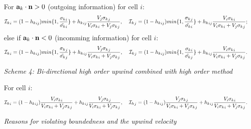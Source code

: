\noindent
For ${\bf a}_k\cdot {\bf n}>0$ (outgoing information) for cell $i$: 
\begin{equation}
{{\cal I}_k}_i = (1-{h_k}_{ij}) min\{ 1, \frac{{\sigma_k}_i}{\tilde{\sigma_k}_i}  \} 
+ {h_k}_{ij}\frac{ V_j{\sigma_k}_j }{ V_i{\sigma_k}_i + V_j{\sigma_k}_j },  \;\;\;\; 
{{\cal I}_k}_j = (1-{h_k}_{ij}) min\{ 1, \frac{{\sigma_k}_j}{\tilde{\sigma_k}_i}  \}
+ {h_k}_{ij}\frac{ V_i{\sigma_k}_i }{ V_i{\sigma_k}_i + V_j{\sigma_k}_j }; 
\end{equation} 
else if ${\bf a}_k\cdot {\bf n}<0$ (incomming information) for cell $i$:
\begin{equation}
{{\cal I}_k}_i = (1-{h_k}_{ij}) min\{ 1, \frac{{\sigma_k}_j}{\tilde{\sigma_k}_j}  \} 
+ {h_k}_{ij}\frac{ V_j{\sigma_k}_j }{ V_i{\sigma_k}_i + V_j{\sigma_k}_j },  \;\;\;\; 
{{\cal I}_k}_j = (1-{h_k}_{ij}) min\{ 1, \frac{{\sigma_k}_i}{\tilde{\sigma_k}_j}  \}
+ {h_k}_{ij}\frac{ V_i{\sigma_k}_i }{ V_i{\sigma_k}_i + V_j{\sigma_k}_j }.   
\end{equation} 


\vspace{1cm}
\noindent
{\it Scheme 4: Bi-directional high order upwind combined with high order method} 

\noindent
For cell $i$: 
\begin{equation}
{{\cal I}_h}_i = (1-{h_k}_{ij}) \frac{ V_i{\sigma_k}_i }{ V_i{\sigma_k}_i + V_j{\sigma_k}_j }
+ {h_k}_{ij}\frac{ V_j{\sigma_k}_j }{ V_i{\sigma_k}_i + V_j{\sigma_k}_j },  \;\;\;\; 
{{\cal I}_h}_j = (1-{h_k}_{ij}) \frac{ V_j{\sigma_k}_j }{ V_i{\sigma_k}_i + V_j{\sigma_k}_j }
+ {h_k}_{ij}\frac{ V_i{\sigma_k}_i }{ V_i{\sigma_k}_i + V_j{\sigma_k}_j }.   
\end{equation} 



\vspace{1cm}
\noindent
{\it Reasons for violating boundedness and the upwind velocity} 

